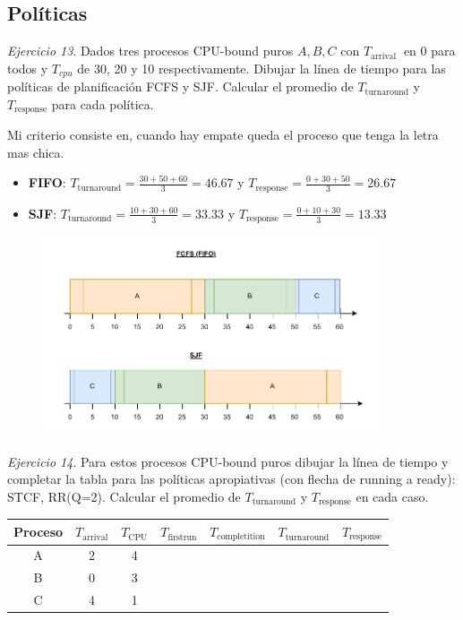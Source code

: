 \documentclass[12pt]{article}
\begin{document}
\newpage
\subsection*{Políticas}

\noindent \textit{Ejercicio 13}. Dados tres procesos CPU-bound puros $A, B, C$ con $T_{\text {arrival }}$ en 0 para todos y $T_{c p u}$ de 30, 20 y 10 respectivamente. Dibujar la línea de tiempo para las políticas de planificación FCFS y SJF. Calcular el promedio de $T_{\text{turnaround}}$ y $T_{\text{response}}$ para cada política.

\begin{rta}
    Mi criterio consiste en, cuando hay empate queda el proceso que tenga la letra mas chica.
    \begin{itemize}
        \item \textbf{FIFO}: $T_{\text{turnaround}} = \frac{30+50+60}{3} = 46.67$ y $T_{\text{response}} = \frac{0+30+50}{3} = 26.67$  
        \item \textbf{SJF}: $T_{\text{turnaround}} = \frac{10+30+60}{3} = 33.33$ y $T_{\text{response}} = \frac{0+10+30}{3} = 13.33$
    \end{itemize}
\end{rta}

\begin{figure}[h]
    \centering
    \includegraphics[width=0.9\textwidth]{ej13.pdf}
\end{figure}


\noindent \textit{Ejercicio 14}. Para estos procesos CPU-bound puros dibujar la línea de tiempo y completar la tabla para las políticas apropiativas (con flecha de running a ready): STCF, RR(Q=2). Calcular el promedio de $T_{\text{turnaround}}$ y $T_{\text{response}}$ en cada caso.

\begin{center}
    \begin{tabular}{c|cc|cc|cc}
        Proceso & $T_{\text{arrival}}$ & $T_{\text{CPU}}$ & $T_{\text{firstrun}}$ & $T_{\text{completition}}$ & $T_{\text{turnaround}}$ & $T_{\text{response}}$ \\
        \hline
        A & 2 & 4 & & & & \\
        B & 0 & 3 & & & & \\
        C & 4 & 1 & & & & \\
        \hline
    \end{tabular}
\end{center}
\end{document}
